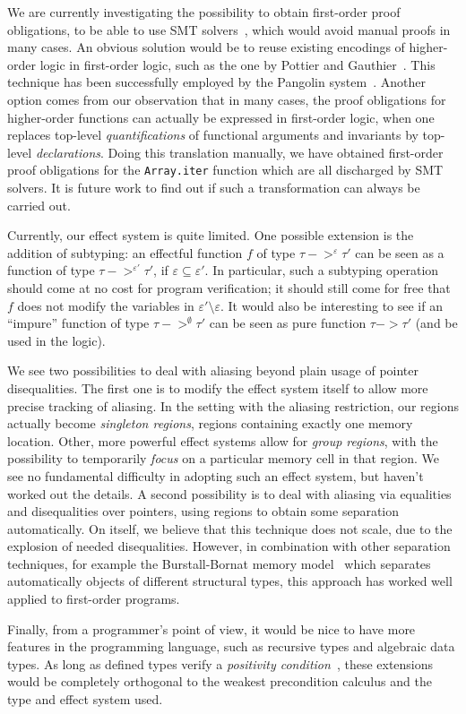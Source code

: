 \documentclass[a4paper]{llncs}
\begin{document}
We are currently investigating the possibility to obtain first-order proof
obligations, to be able to use SMT solvers~\cite{RanTin-SMTLIB}, which would
avoid manual proofs in many cases. An obvious solution would be to reuse
existing encodings of higher-order logic in first-order logic, such as the one
by Pottier and Gauthier~\cite{pottier-gauthier-hosc}. This technique has been
successfully employed by the Pangolin system~\cite{regis-gianas-pottier-08}.
Another option comes from our observation that in many cases, the proof
obligations for higher-order functions can actually be expressed in
first-order logic, when one replaces top-level {\em quantifications} of
functional arguments and invariants by top-level {\em declarations}. Doing
this translation manually, we have obtained first-order proof
obligations for the {\tt Array.iter} function which are all discharged by
SMT solvers. It is future work to find out if such a transformation can always
be carried out.

Currently, our effect system is quite limited. One possible extension is the
addition of subtyping: an effectful function $f$ of type $τ ->^ετ'$ can be seen
as a function of type $τ ->^{ε'}τ'$, if $ε\subseteq ε'$. In particular, such a
subtyping operation should come at no cost for program verification; it should
still come for free that $f$ does not modify the variables in $ε'\setminus ε$. It
would also be interesting to see if an ``impure'' function of type $τ
->^\emptyset τ'$ can be seen as pure function $τ -> τ'$ (and be used in the
logic).

We see two possibilities to deal with aliasing beyond plain usage of pointer
disequalities. The first one is to modify the effect system itself to allow
more precise tracking of aliasing. In the setting with the aliasing
restriction, our regions actually become {\em singleton regions}, regions
containing exactly one memory location. Other, more powerful effect systems
allow for {\em group regions}, with the possibility to temporarily {\em focus
} on a particular memory cell in that region. We see no fundamental difficulty
in adopting such an effect system, but haven't worked out the details. A
second possibility is to deal with aliasing via equalities and disequalities
over pointers, using regions to obtain some separation automatically. On
itself, we believe that this technique does not scale, due to the explosion of
needed disequalities.  However, in combination with other separation
techniques, for example the Burstall-Bornat memory model~\cite{bornat00mpc}
which separates automatically objects of different structural types, this
approach has worked well applied to first-order programs.

Finally, from a programmer's point of view, it would be nice to have more
features in the programming language, such as recursive types and algebraic
data types. As long as defined types verify a {\em positivity
condition}~\cite{paulintlca93}, these extensions would be completely
orthogonal to the weakest precondition calculus and the type and effect system
used.



{}
\end{document}
